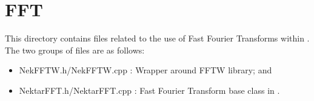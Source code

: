 %
\section{FFT}

This directory contains files related to the use of Fast Fourier Transforms within {\nek}.  The two groups of files are as follows:
\begin{itemize}
\item NekFFTW.h/NekFFTW.cpp : Wrapper around FFTW library; and
%
\item NektarFFT.h/NektarFFT.cpp : Fast Fourier Transform base class in {\nek}.
\end{itemize}